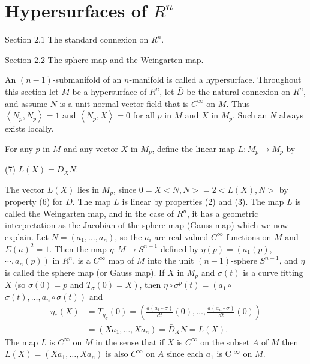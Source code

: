 \documentclass[10pt]{article}
\begin{document}
\section{Hypersurfaces of $R^{n}$}


Section $2.1$ The standard connexion on $R^{n}$.



Section 2.2 The sphere map and the Weingarten map.

An $(n-1)$-submanifold of an $n$-manifold is called a hypersurface. Throughout this section let $M$ be a hypersurface of $R^{n}$, let $\bar{D}$ be the natural connexion on $R^{n}$, and assume $N$ is a unit normal vector field that is $C^{\infty}$ on $M$. Thus $\left\langle N_{p}, N_{p}\right\rangle=1$ and $\left\langle N_{p}, X\right\rangle=0$ for all $p$ in $M$ and $X$ in $M_{p} .$ Such an $N$ always exists locally.

For any $p$ in $M$ and any vector $X$ in $M_{p}$, define the linear map $L: M_{p} \rightarrow M_{p}$ by

(7) $L(X)=\bar{D}_{X} N$.

The vector $L(X)$ lies in $M_{p}$, since $0=X<N, N>=2<L(X), N>$ by property (6) for $\bar{D}$. The map $L$ is linear by properties (2) and (3). The map $L$ is called the Weingarten map, and in the case of $R^{n}$, it has a geometric interpretation as the Jacobian of the sphere map (Gauss map) which we now explain. Let $N=\left(a_{1}, \ldots, a_{n}\right)$, so the $a_{i}$ are real valued $C^{\infty}$ functions on $M$ and $\Sigma(a)^{2}=1$. Then the map $\eta: M \rightarrow S^{n-1}$ defined by $\eta(p)=\left(a_{1}(p)\right.$, $\left.\cdots, a_{n}(p)\right)$ in $R^{n}$, is a $C^{\infty}$ map of $M$ into the unit $(n-1)$-sphere $S^{n-1}$, and $\eta$ is called the sphere map (or Gauss map). If $X$ in $M_{p}$ and $\sigma(t)$ is a curve fitting $X$ (so $\sigma(0)=p$ and $\left.T_{\sigma}(0)=X\right)$, then $\eta \circ \sigma^{p}(t)=\left(a_{1} \circ\right.$ $\left.\sigma(t), \ldots, a_{n} \circ \sigma(t)\right)$ and
$$
\begin{aligned}
\eta_{*}(X) &=T_{\eta_{\sigma}}(0)=\left(\frac{d\left(a_{1} \circ \sigma\right)}{d t}(0), \ldots, \frac{d\left(a_{n} \circ \sigma\right)}{d t}(0)\right) \\
&=\left(X a_{1}, \ldots, X a_{n}\right)=\bar{D}_{X} N=L(X) .
\end{aligned}
$$
The map $L$ is $C^{\infty}$ on $M$ in the sense that if $X$ is $C^{\infty}$ on the subset $A$ of $M$ then $L(X)=\left(X a_{1}, \ldots, X a_{n}\right)$ is also $C^{\infty}$ on $A$ since each $a_{1}$ is C $^{\infty}$ on $M .$
\end{document}
